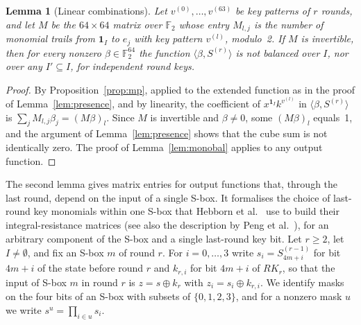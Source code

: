 \documentclass[pdflatex,sn-mathphys-num]{sn-jnl}
\theoremstyle{thmstyleone}
\newtheorem{lemma}{Lemma}
\theoremstyle{thmstylethree}
\theoremstyle{thmstyletwo}
\newcommand{\Ftwo}{\mathbb{F}_2}
\begin{document}
\begin{lemma}[Linear combinations]\label{lem:lincomb}
Let $v^{(0)},\dots,v^{(63)}$ be key patterns of $r$ rounds, and let $M$ be the $64\times64$ matrix over $\Ftwo$ whose entry $M_{l,j}$ is the number of monomial trails from $\mathbf 1_I$ to $e_j$ with key pattern $v^{(l)}$, modulo~2. If $M$ is invertible, then for every nonzero $\beta\in\Ftwo^{64}$ the function $\langle\beta,S^{(r)}\rangle$ is not balanced over $I$, nor over any $I'\subseteq I$, for independent round keys.
\end{lemma}
\begin{proof}
By Proposition~\ref{prop:mp}, applied to the extended function as in the proof of Lemma~\ref{lem:presence}, and by linearity, the coefficient of $x^{\mathbf 1_I}k^{v^{(l)}}$ in $\langle\beta,S^{(r)}\rangle$ is $\sum_j M_{l,j}\beta_j=(M\beta)_l$. Since $M$ is invertible and $\beta\neq0$, some $(M\beta)_l$ equals~1, and the argument of Lemma~\ref{lem:presence} shows that the cube sum is not identically zero. The proof of Lemma~\ref{lem:monobal} applies to any output function.
\end{proof}

The second lemma gives matrix entries for output functions that, through the last round, depend on the input of a single S-box. It formalises the choice of last-round key monomials within one S-box that Hebborn et al.~\cite{hebborn2021} use to build their integral-resistance matrices (see also the description by Peng et al.~\cite{peng2026}), for an arbitrary component of the S-box and a single last-round key bit. Let $r\ge2$, let $I\neq\emptyset$, and fix an S-box $m$ of round $r$. For $i=0,\dots,3$ write $s_i=S^{(r-1)}_{4m+i}$ for bit $4m+i$ of the state before round $r$ and $k_{r,i}$ for bit $4m+i$ of $RK_r$, so that the input of S-box $m$ in round $r$ is $z=s\oplus k_{r}$ with $z_i=s_i\oplus k_{r,i}$. We identify masks on the four bits of an S-box with subsets of $\{0,1,2,3\}$, and for a nonzero mask $u$ we write $s^u=\prod_{i\in u}s_i$.
\end{document}
